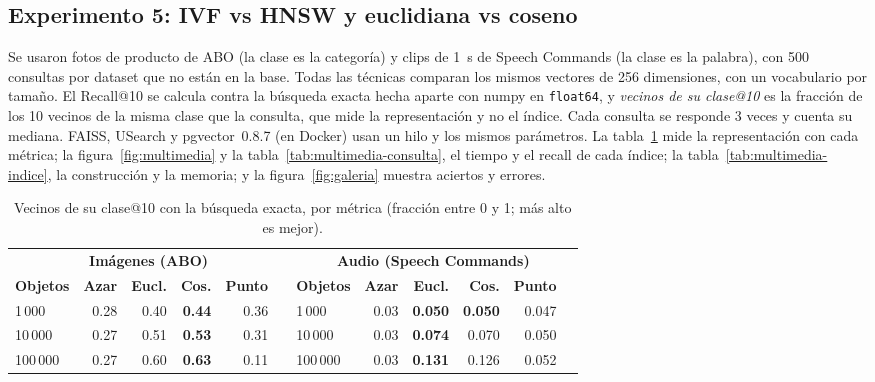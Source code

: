\FloatBarrier
\subsection{Experimento 5: IVF vs HNSW y euclidiana vs coseno}

Se usaron fotos de producto de ABO (la clase es la categoría) y clips de 1~s de Speech
Commands (la clase es la palabra), con 500 consultas por dataset que no están en la base.
Todas las técnicas comparan los mismos vectores de 256 dimensiones, con un vocabulario por
tamaño. El Recall@10 se calcula contra la búsqueda exacta hecha aparte con numpy en
\texttt{float64}, y \emph{vecinos de su clase@10} es la fracción de los 10 vecinos de la
misma clase que la consulta, que mide la representación y no el índice. Cada consulta se
responde 3 veces y cuenta su mediana. FAISS, USearch y pgvector~0.8.7 (en Docker) usan un
hilo y los mismos parámetros. La tabla~\ref{tab:clase} mide la representación con cada
métrica; la figura~\ref{fig:multimedia} y la tabla~\ref{tab:multimedia-consulta}, el tiempo y
el recall de cada índice; la tabla~\ref{tab:multimedia-indice}, la construcción y la memoria; y
la figura~\ref{fig:galeria} muestra aciertos y errores.

\begin{table}[!htb]
\centering
\caption{Vecinos de su clase@10 con la búsqueda exacta, por métrica (fracción entre 0 y 1;
más alto es mejor).}\label{tab:clase}
\small
\begin{tabular}{@{}lrrrrr@{\hspace{2.2em}}lrrrrr@{}}
\toprule
\multicolumn{6}{c}{\textbf{Imágenes (ABO)}} & \multicolumn{6}{c}{\textbf{Audio (Speech Commands)}} \\
\cmidrule(r){1-6}\cmidrule(l){7-12}
\textbf{Objetos} & \textbf{Azar} & \textbf{Eucl.} & \textbf{Cos.} & \textbf{Punto} & &
\textbf{Objetos} & \textbf{Azar} & \textbf{Eucl.} & \textbf{Cos.} & \textbf{Punto} & \\
\midrule
1\,000   & 0.28 & 0.40 & \textbf{0.44} & 0.36 & & 1\,000   & 0.03 & \textbf{0.050} & \textbf{0.050} & 0.047 & \\
10\,000  & 0.27 & 0.51 & \textbf{0.53} & 0.31 & & 10\,000  & 0.03 & \textbf{0.074} & 0.070 & 0.050 & \\
100\,000 & 0.27 & 0.60 & \textbf{0.63} & 0.11 & & 100\,000 & 0.03 & \textbf{0.131} & 0.126 & 0.052 & \\
\bottomrule
\end{tabular}
\end{table}

